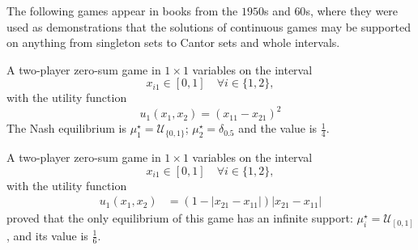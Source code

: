 The following games appear in books from the $1950$s and $60$s, where they were used as demonstrations that the solutions of continuous games may be supported on anything from singleton sets to Cantor sets and whole intervals.

\begin{game}\label{ex.dresher61.pg110}
A two-player zero-sum game in $1 \times 1$ variables on the interval
$$x_{i1} \in [0,1] \quad \forall i \in \{1, 2\},$$
with the utility function \cite[pg. 110]{Dresher2007-ez}
\begin{equation*}
u_{1}\left( x_{1}, x_{2} \right) = \left( x_{11} - x_{21} \right)^{2}
\end{equation*}
The Nash equilibrium is $\mu_1^\star = \mathcal{U}_{\{0,1\}}$; $\mu_2^\star = \delta_{0.5}$ and the value is $\frac{1}{4}$.
\end{game}

\noindent
\begin{minipage}[c]{0.6\textwidth}
\begin{game}\label{ex.dresher61.pg111}
A two-player zero-sum game in $1 \times 1$ variables on the interval
$$x_{i1} \in [0,1] \quad \forall i \in \{1, 2\},$$
with the utility function
\begin{align*}
u_{1}\left( x_{1}, x_{2} \right) &= \left( 1 - \left| x_{21} - x_{11} \right| \right) \left|  x_{21} - x_{11} \right|
\end{align*}
\textcite[pg. 111]{Dresher2007-ez} proved that the only equilibrium of this game has an infinite support: $\mu_i^\star = \mathcal{U}_{[0,1]}$, and its value is $\frac{1}{6}$.
\end{game}
\end{minipage}
\hfill
\begin{minipage}[c]{0.35\textwidth}
\end{minipage}


